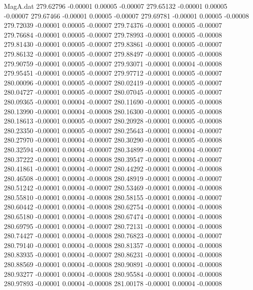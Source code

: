 \begin{filecontents}{MagA.dat}
 279.62796   -0.00001    0.00005   -0.00007
 279.65132   -0.00001    0.00005   -0.00007
 279.67466   -0.00001    0.00005   -0.00007
 279.69781   -0.00001    0.00005   -0.00008
 279.72039   -0.00001    0.00005   -0.00007
 279.74376   -0.00001    0.00005   -0.00007
 279.76684   -0.00001    0.00005   -0.00007
 279.78993   -0.00001    0.00005   -0.00008
 279.81430   -0.00001    0.00005   -0.00007
 279.83861   -0.00001    0.00005   -0.00007
 279.86132   -0.00001    0.00005   -0.00007
 279.88497   -0.00001    0.00005   -0.00008
 279.90759   -0.00001    0.00005   -0.00007
 279.93071   -0.00001    0.00004   -0.00008
 279.95451   -0.00001    0.00005   -0.00007
 279.97712   -0.00001    0.00005   -0.00007
 280.00096   -0.00001    0.00005   -0.00007
 280.02419   -0.00001    0.00005   -0.00007
 280.04727   -0.00001    0.00005   -0.00007
 280.07045   -0.00001    0.00005   -0.00007
 280.09365   -0.00001    0.00004   -0.00007
 280.11690   -0.00001    0.00005   -0.00008
 280.13990   -0.00001    0.00004   -0.00008
 280.16300   -0.00001    0.00005   -0.00008
 280.18613   -0.00001    0.00005   -0.00007
 280.20928   -0.00001    0.00005   -0.00008
 280.23350   -0.00001    0.00005   -0.00007
 280.25643   -0.00001    0.00004   -0.00007
 280.27970   -0.00001    0.00004   -0.00007
 280.30290   -0.00001    0.00005   -0.00008
 280.32594   -0.00001    0.00004   -0.00007
 280.34899   -0.00001    0.00004   -0.00007
 280.37222   -0.00001    0.00004   -0.00008
 280.39547   -0.00001    0.00004   -0.00007
 280.41861   -0.00001    0.00004   -0.00007
 280.44292   -0.00001    0.00004   -0.00008
 280.46508   -0.00001    0.00004   -0.00008
 280.48919   -0.00001    0.00004   -0.00007
 280.51242   -0.00001    0.00004   -0.00007
 280.53469   -0.00001    0.00004   -0.00008
 280.55810   -0.00001    0.00004   -0.00008
 280.58155   -0.00001    0.00004   -0.00007
 280.60442   -0.00001    0.00004   -0.00008
 280.62754   -0.00001    0.00004   -0.00008
 280.65180   -0.00001    0.00004   -0.00008
 280.67474   -0.00001    0.00004   -0.00008
 280.69795   -0.00001    0.00004   -0.00007
 280.72131   -0.00001    0.00004   -0.00008
 280.74427   -0.00001    0.00004   -0.00008
 280.76823   -0.00001    0.00004   -0.00007
 280.79140   -0.00001    0.00004   -0.00008
 280.81357   -0.00001    0.00004   -0.00008
 280.83935   -0.00001    0.00004   -0.00007
 280.86231   -0.00001    0.00004   -0.00008
 280.88569   -0.00001    0.00004   -0.00008
 280.90891   -0.00001    0.00004   -0.00008
 280.93277   -0.00001    0.00004   -0.00008
 280.95584   -0.00001    0.00004   -0.00008
 280.97893   -0.00001    0.00004   -0.00008
 281.00178   -0.00001    0.00004   -0.00008

\end{filecontents}
